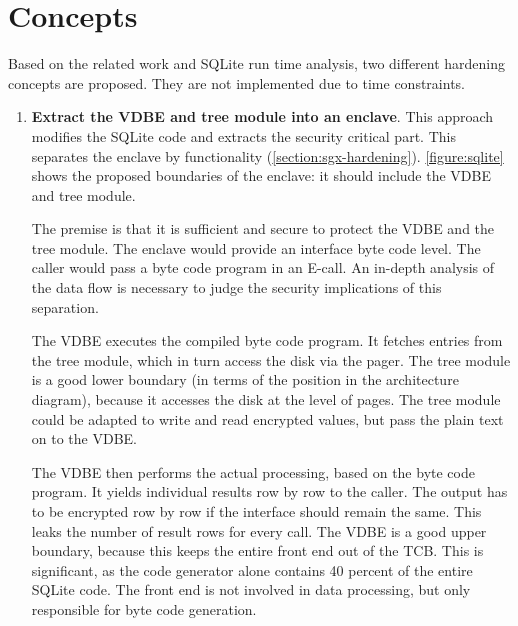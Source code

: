 \section{Concepts\label{ID_207205158}}
Based on the related work and SQLite run time analysis, two different hardening concepts are proposed.\label{ID_806012991}
They are not implemented due to time constraints.\label{ID_946377050}
\begin{enumerate}\label{ID_1303002590}
\item \textbf{Extract the VDBE and tree module into an enclave}.\label{ID_1825072810}
This approach modifies the SQLite code and extracts the security critical part.\label{ID_738821968}
This separates the enclave by functionality (\autoref{section:sgx-hardening}).\label{ID_202493526}
\autoref{figure:sqlite} shows the proposed boundaries of the enclave: it should include the VDBE and tree module.\label{ID_439588279}

The premise is that it is sufficient and secure to protect the VDBE and the tree module.\label{ID_1686599994}
The enclave would provide an interface byte code level. The caller would pass a byte code program in an E-call.\label{ID_5813842}
An in-depth analysis of the data flow is necessary to judge the security implications of this separation.\label{ID_1466004524}

The VDBE executes the compiled byte code program.\label{ID_1148708431}
It fetches entries from the tree module, which in turn access the disk via the pager.\label{ID_770004437}
The tree module is a good lower boundary (in terms of the position in the architecture diagram), because it accesses the disk at the level of pages.\label{ID_1349045404}
The tree module could be adapted to write and read encrypted values, but pass the plain text on to the VDBE.\label{ID_284478389}

The VDBE then performs the actual processing, based on the byte code program.\label{ID_821794728}
It yields individual results row by row to the caller.\label{ID_668651794}
The output has to be encrypted row by row if the interface should remain the same.\label{ID_364110747}
This leaks the number of result rows for every call.\label{ID_999515110}
The VDBE is a good upper boundary, because this keeps the entire front end out of the TCB.\label{ID_311205996}
This is significant, as the code generator alone contains 40 percent of the entire SQLite code.\cite[]{Haldar2015}\label{ID_1881798180}
The front end is not involved in data processing, but only responsible for byte code generation.\label{ID_59920578}


\end{enumerate}
